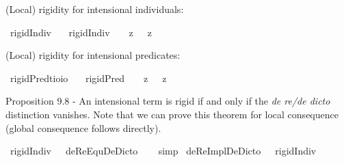 \begin{isabellebody}
{}
\isamarkuptrue%
%
\begin{isamarkuptext}%
(Local) rigidity for intensional individuals:%
\end{isamarkuptext}\isamarkuptrue%
\isamarkupfalse%
\ rigidIndiv{\isacharcolon}{\isacharcolon}{\isachardoublequoteopen}{\isasymup}{\isasymlangle}{\isasymup}{\isasymzero}{\isasymrangle}{\isachardoublequoteclose}\ \isanewline
\ \ {\isachardoublequoteopen}rigidIndiv\ {\isasymtau}\ {\isasymequiv}\ {\isacharparenleft}{\isasymlambda}{\isasymbeta}{\isachardot}\ \isactrlbold {\isasymbox}{\isacharparenleft}{\isacharparenleft}{\isasymlambda}z{\isachardot}\ {\isasymbeta}\ \isactrlbold {\isasymapprox}\ z{\isacharparenright}\ {\isasymdownharpoonleft}{\isasymtau}{\isacharparenright}{\isacharparenright}\ {\isasymdownharpoonleft}{\isasymtau}{\isachardoublequoteclose}%
\begin{isamarkuptext}%
(Local) rigidity for intensional predicates:%
\end{isamarkuptext}\isamarkuptrue%
\isamarkupfalse%
\ rigidPred{\isacharcolon}{\isacharcolon}{\isachardoublequoteopen}{\isacharparenleft}{\isacharprime}t{\isasymRightarrow}io{\isacharparenright}{\isasymRightarrow}io{\isachardoublequoteclose}\ \isanewline
\ \ {\isachardoublequoteopen}rigidPred\ {\isasymtau}\ {\isasymequiv}\ {\isacharparenleft}{\isasymlambda}{\isasymbeta}{\isachardot}\ \isactrlbold {\isasymbox}{\isacharparenleft}{\isacharparenleft}{\isasymlambda}z{\isachardot}\ {\isasymbeta}\ \isactrlbold {\isasymapprox}\ z{\isacharparenright}\ \isactrlbold {\isasymdown}{\isasymtau}{\isacharparenright}{\isacharparenright}\ \isactrlbold {\isasymdown}{\isasymtau}{\isachardoublequoteclose}%
\begin{isamarkuptext}%
Proposition 9.8 - An intensional term is rigid if and only if the \emph{de re/de dicto} distinction vanishes.
Note that we can prove this theorem for local consequence (global consequence follows directly).%
\end{isamarkuptext}\isamarkuptrue%
\isamarkupfalse%
\ {\isachardoublequoteopen}{\isasymlfloor}rigidIndiv\ {\isacharparenleft}{\isasymtau}{\isacharcolon}{\isacharcolon}{\isasymup}{\isasymzero}{\isacharparenright}\ \isactrlbold {\isasymrightarrow}\ deReEquDeDicto\ {\isasymtau}{\isasymrfloor}{\isachardoublequoteclose}%
\ %
%
\isamarkupfalse%
\ simp%
%
%
\isanewline
{}\isamarkupfalse%
\ {\isachardoublequoteopen}{\isasymlfloor}deReImplDeDicto\ {\isacharparenleft}{\isasymtau}{\isacharcolon}{\isacharcolon}{\isasymup}{\isasymzero}{\isacharparenright}\ \isactrlbold {\isasymrightarrow}\ rigidIndiv\ {\isasymtau}{\isasymrfloor}{\isachardoublequoteclose}%

\end{isabellebody}
